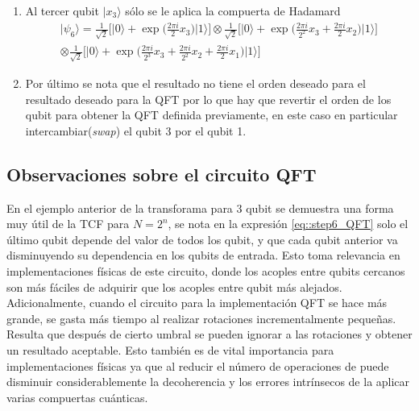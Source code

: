 \documentclass[a4paper]{article}
\begin{document}
\begin{enumerate}
\begin{equation}
\vert \psi_5\rangle=\vert x_3\rangle \otimes \frac{1}{\sqrt{2}}\bigg[ \vert 0\rangle + \exp{\bigg(\frac{2\pi i}{2^2} x_3 + \frac{2\pi i}{2} x_2 \bigg)}\vert 1\rangle\bigg] \otimes  \frac{1}{\sqrt{2}}\bigg[ \vert 0\rangle + \exp{\bigg(\frac{2\pi i}{2^3} x_3 +\frac{2\pi i}{2^2} x_2+\frac{2\pi i}{2} x_1\bigg)}\vert 1\rangle\bigg]
\end{equation}
\item Al tercer qubit $\vert x_3\rangle$ sólo se le aplica la compuerta de Hadamard
\begin{equation}\label{eq::step6_QFT}
\begin{aligned}
\vert \psi_6 \rangle= \frac{1}{\sqrt{2}}\bigg[ \vert 0\rangle + \exp{\bigg( \frac{2\pi i}{2} x_3 \bigg)}\vert 1\rangle\bigg] \otimes \frac{1}{\sqrt{2}}\bigg[ \vert 0\rangle + \exp{\bigg(\frac{2\pi i}{2^2} x_3 + \frac{2\pi i}{2} x_2 \bigg)}\vert 1\rangle\bigg]\\
 \otimes  \frac{1}{\sqrt{2}}\bigg[ \vert 0\rangle + \exp{\bigg(\frac{2\pi i}{2^3} x_3 +\frac{2\pi i}{2^2} x_2+\frac{2\pi i}{2} x_1\bigg)}\vert 1\rangle\bigg]
\end{aligned}
\end{equation}
\item Por último se nota que el resultado no tiene el orden deseado para el resultado deseado para la QFT por lo que hay que revertir el orden de los qubit para obtener la QFT definida previamente, en este caso en particular intercambiar(\textit{swap}) el qubit 3 por el qubit 1.
\end{enumerate}
\subsection{Observaciones sobre el circuito QFT}
En el ejemplo anterior de la transforama para 3 qubit se demuestra una forma muy útil de la TCF para $N=2^n$, se nota en la expresión \ref{eq::step6_QFT} solo el último qubit depende del valor de todos los qubit, y que cada qubit anterior va disminuyendo su dependencia en los qubits de entrada. Esto toma relevancia en implementaciones físicas de este circuito, donde los acoples entre qubits cercanos son más fáciles de adquirir que los acoples entre qubit más alejados.\\

Adicionalmente, cuando el circuito para la implementación QFT se hace más grande, se gasta más tiempo al realizar rotaciones incrementalmente pequeñas. Resulta que después de cierto umbral se pueden ignorar a las rotaciones y obtener un resultado aceptable. Esto también es de vital importancia para implementaciones físicas ya que al reducir el número de operaciones de puede disminuir considerablemente la decoherencia y los errores intrínsecos de la aplicar varias compuertas cuánticas.
\end{document}
